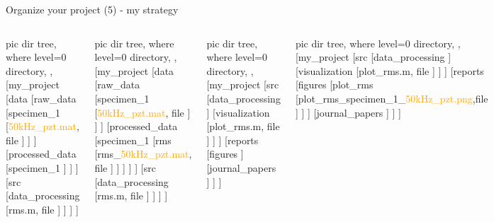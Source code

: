\documentclass[10pt,aspectratio=169,notes]{beamer} %
\begin{document}
\begin{frame}[t]{Organize your project (5) - my strategy}
\vspace{-5mm}
\begin{columns}[T]
	\centering
	{
	\begin{forest}
		pic dir tree,
		where level=0{}{%
			directory,
		},
		[my\_project
		[data
		[raw\_data
			[specimen\_1
				[\textcolor{orange}{50kHz\_pzt.mat}, file
				]
			]
		]
		[processed\_data
			[specimen\_1
			]
		]
		]
		[src
			[data\_processing
				[\alert{rms.m}, file
				]
			]
		]
		]
	\end{forest}
	}
	{
		\begin{forest}
			pic dir tree,
			where level=0{}{%
				directory,
			},
			[my\_project
			[data
			[raw\_data
				[specimen\_1
					[\textcolor{orange}{50kHz\_pzt.mat}, file
					]
				]
			]
			[processed\_data
				[specimen\_1
					[\alert{rms}
						[\alert{rms}\_\textcolor{orange}{50kHz\_pzt.mat}, file
						]
					]
				]
			]
			]
			[src
				[data\_processing
					[\alert{rms.m}, file
					]
				]
			]
			]
		\end{forest}
	}
	\centering
	{
	\begin{forest}
		pic dir tree,
		where level=0{}{%
			directory,
		},
		[my\_project
		[src
			[data\_processing
			]
			[visualization
				[\alert{plot\_rms.m}, file
				]
			]
		]
		[reports
			[figures
			]
			[journal\_papers
			]
		]
		]
	\end{forest}
	}
	{
	\begin{forest}
		pic dir tree,
		where level=0{}{%
			directory,
		},
		[my\_project
		[src
			[data\_processing
			]
			[visualization
				[\alert{plot\_rms.m}, file
				]
			]
		]
		[reports
			[figures
				[\alert{plot\_rms}
					[\alert{plot\_rms}\_specimen\_1\_\textcolor{orange}{50kHz\_pzt.png},file
					]
				]
			]
			[journal\_papers
			]
		]
		]
	\end{forest}
	}
\end{columns}	
\end{frame}
\end{document}
